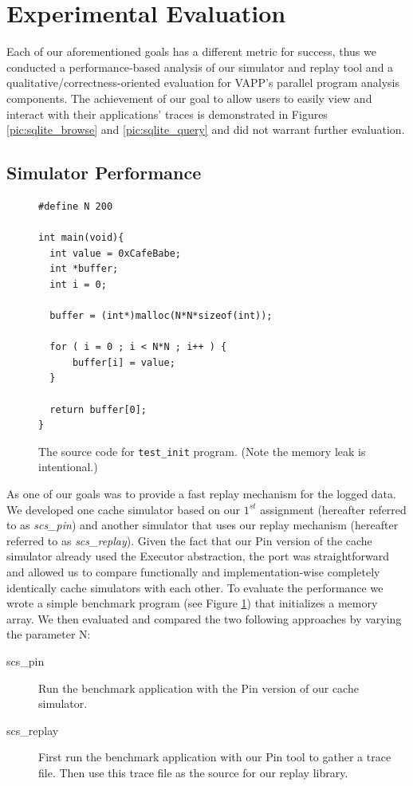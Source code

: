 \section{Experimental Evaluation}
Each of our aforementioned goals has a different metric
for success, thus we conducted a performance-based
analysis of our simulator and replay tool and a
qualitative/correctness-oriented evaluation for
VAPP's parallel program analysis components.  The achievement
of our goal to allow users to easily view and
interact with their applications' traces is demonstrated
in Figures \ref{pic:sqlite_browse} and \ref{pic:sqlite_query}
and did not warrant further evaluation.

\subsection{Simulator Performance}
\label{sec:sim_perf}

\begin{figure}
  \lstset{language=C, basicstyle=\small}
  \begin{lstlisting}
#define N 200

int main(void){
  int value = 0xCafeBabe;
  int *buffer;
  int i = 0;

  buffer = (int*)malloc(N*N*sizeof(int));

  for ( i = 0 ; i < N*N ; i++ ) {
      buffer[i] = value;
  }

  return buffer[0];
}
  \end{lstlisting}
  \caption{The source code for \texttt{test\_init} program. (Note the memory leak is intentional.)}
  \label{fig:test_init}
\end{figure}

As one of our goals was to provide a fast replay mechanism for the
logged data. We developed one cache simulator based on our
$1^{st}$ assignment (hereafter referred to as \emph{scs\_pin}) and another
simulator that uses our replay mechanism (hereafter referred to as
\emph{scs\_replay}). Given the fact that our Pin version of the cache
simulator already used the Executor abstraction, the port was straightforward
and allowed us to compare functionally and implementation-wise
completely identically cache simulators with each other. To evaluate
the performance we wrote a simple benchmark program (see Figure
\ref{fig:test_init}) that initializes a memory array. We then evaluated
and compared the two following approaches by varying the parameter N:

\begin{description}
  \item[scs\_pin] Run the benchmark application with the Pin version of
    our cache simulator.
  \item[scs\_replay] First run the benchmark application with our Pin
    tool to gather a trace file. Then use this trace file as the
    source for our replay library.
\end{description}

